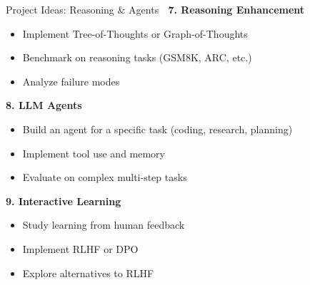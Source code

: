 \documentclass[aspectratio=169]{beamer}
\begin{document}
\begin{frame}[shrink=10]{Project Ideas: Reasoning \& Agents 🤖}
\textbf{7. Reasoning Enhancement}
\begin{itemize}\setlength{\itemsep}{0pt}
    \item Implement Tree-of-Thoughts or Graph-of-Thoughts
    \item Benchmark on reasoning tasks (GSM8K, ARC, etc.)
    \item Analyze failure modes
\end{itemize}

\vspace{0.5em}

\textbf{8. LLM Agents}
\begin{itemize}\setlength{\itemsep}{0pt}
    \item Build an agent for a specific task (coding, research, planning)
    \item Implement tool use and memory
    \item Evaluate on complex multi-step tasks
\end{itemize}

\vspace{0.5em}

\textbf{9. Interactive Learning}
\begin{itemize}\setlength{\itemsep}{0pt}
    \item Study learning from human feedback
    \item Implement RLHF or DPO
    \item Explore alternatives to RLHF
\end{itemize}
\end{frame}
\end{document}
